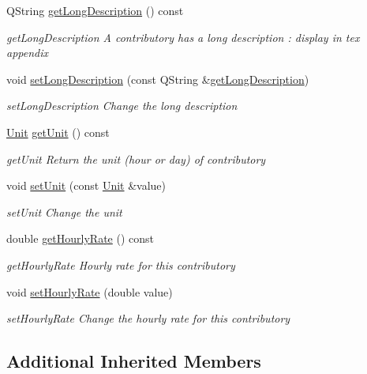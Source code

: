 \begin{DoxyCompactItemize}
Q\+String \hyperlink{classModels_1_1Contributory_abcd8dce3a913d558b73f17f16d5beb7a}{get\+Long\+Description} () const 
\begin{DoxyCompactList}\small\item\em get\+Long\+Description A contributory has a long description \+: display in tex appendix \end{DoxyCompactList}\item 
void \hyperlink{classModels_1_1Contributory_a40023cef80233eaa814d7bb41d668322}{set\+Long\+Description} (const Q\+String \&\hyperlink{classModels_1_1Contributory_abcd8dce3a913d558b73f17f16d5beb7a}{get\+Long\+Description})
\begin{DoxyCompactList}\small\item\em set\+Long\+Description Change the long description \end{DoxyCompactList}\item 
\hyperlink{classModels_1_1Unit}{Unit} \hyperlink{classModels_1_1Contributory_aa89a7587555a6ec768638e0c21d17450}{get\+Unit} () const 
\begin{DoxyCompactList}\small\item\em get\+Unit Return the unit (hour or day) of contributory \end{DoxyCompactList}\item 
void \hyperlink{classModels_1_1Contributory_a257273fe7acbd73c885d1c0fdddbb95e}{set\+Unit} (const \hyperlink{classModels_1_1Unit}{Unit} \&value)
\begin{DoxyCompactList}\small\item\em set\+Unit Change the unit \end{DoxyCompactList}\item 
double \hyperlink{classModels_1_1Contributory_aa6e1d43e7ca2e5e09bf6f1b65f577a0b}{get\+Hourly\+Rate} () const 
\begin{DoxyCompactList}\small\item\em get\+Hourly\+Rate Hourly rate for this contributory \end{DoxyCompactList}\item 
void \hyperlink{classModels_1_1Contributory_a08adb4281ec3a57c839290d01b1f41e5}{set\+Hourly\+Rate} (double value)
\begin{DoxyCompactList}\small\item\em set\+Hourly\+Rate Change the hourly rate for this contributory \end{DoxyCompactList}\end{DoxyCompactItemize}
\subsection*{Additional Inherited Members}


